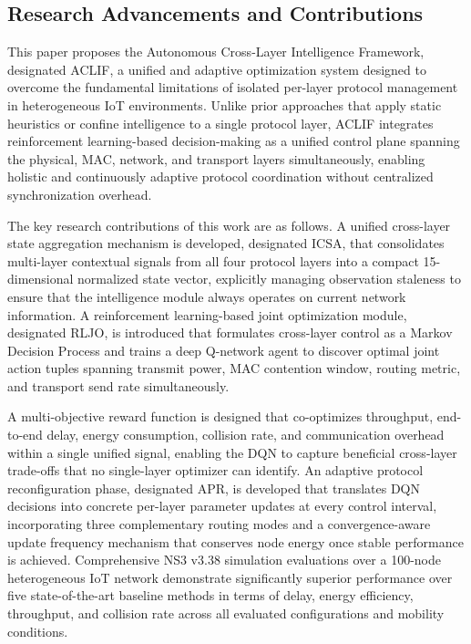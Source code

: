 \documentclass[a4paper]{cas-dc}
\numberwithin{equation}{section}
\begin{document}
\subsection{Research Advancements and Contributions}
\label{subsec:contributions}

This paper proposes the Autonomous Cross-Layer Intelligence Framework, designated ACLIF, a unified and adaptive optimization system designed to overcome the fundamental limitations of isolated per-layer protocol management in heterogeneous IoT environments. Unlike prior approaches that apply static heuristics or confine intelligence to a single protocol layer, ACLIF integrates reinforcement learning-based decision-making as a unified control plane spanning the physical, MAC, network, and transport layers simultaneously, enabling holistic and continuously adaptive protocol coordination without centralized synchronization overhead.

The key research contributions of this work are as follows. A unified cross-layer state aggregation mechanism is developed, designated ICSA, that consolidates multi-layer contextual signals from all four protocol layers into a compact 15-dimensional normalized state vector, explicitly managing observation staleness to ensure that the intelligence module always operates on current network information. A reinforcement learning-based joint optimization module, designated RLJO, is introduced that formulates cross-layer control as a Markov Decision Process and trains a deep Q-network agent to discover optimal joint action tuples spanning transmit power, MAC contention window, routing metric, and transport send rate simultaneously. 

A multi-objective reward function is designed that co-optimizes throughput, end-to-end delay, energy consumption, collision rate, and communication overhead within a single unified signal, enabling the DQN to capture beneficial cross-layer trade-offs that no single-layer optimizer can identify. An adaptive protocol reconfiguration phase, designated APR, is developed that translates DQN decisions into concrete per-layer parameter updates at every control interval, incorporating three complementary routing modes and a convergence-aware update frequency mechanism that conserves node energy once stable performance is achieved. Comprehensive NS3 v3.38 simulation evaluations over a 100-node heterogeneous IoT network demonstrate significantly superior performance over five state-of-the-art baseline methods in terms of delay, energy efficiency, throughput, and collision rate across all evaluated configurations and mobility conditions.
\end{document}
